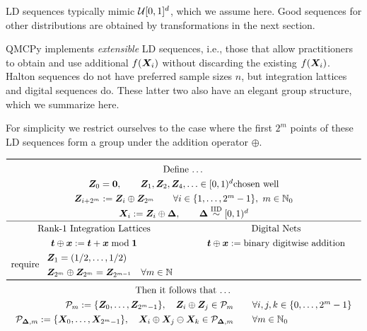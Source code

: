 \documentclass[graybox,footinfo]{svmult}
\newcommand{\IID}{\textup{IID}}
\newcommand{\IIDsim}{\overset{\IID}{\sim}}
\begin{document}
LD sequences typically mimic ${\mathcal{U}}[0,1]^d$, which we assume here.  Good sequences for other distributions are obtained by transformations in the next section.  

QMCPy implements \emph{extensible} LD sequences, i.e., those that allow practitioners to obtain and use additional $f({\boldsymbol{X}}_i)$ without discarding the existing $f({\boldsymbol{X}}_i)$.  Halton sequences do not have preferred sample sizes $n$, but integration lattices and digital sequences do.  These latter two also have an elegant group structure, which we summarize here.  

For simplicity we restrict ourselves to the case where the first $2^m$ points of these LD sequences form a group under the addition operator $\oplus$.

\[
	\renewcommand{\arraystretch}{1.3}
\begin{array}{c@{\qquad}c}
	\toprule
	\multicolumn{2}{c}{\text{Define \ldots}} \\
	\multicolumn{2}{c}{\bsZ_0 = \bszero, \qquad \bsZ_1, \bsZ_2, \bsZ_4, \ldots \in [0,1)^d \text{chosen well} } \\
	\multicolumn{2}{c}{
		\bsZ_{i + 2^m} := \bsZ_i \oplus \bsZ_{2^m} 
		 \qquad
    	\forall  i \in \{1, \ldots, 2^{m} -1\}, \ m \in \bbN_0 }\\
    	\multicolumn{2}{c}{\bsX_i := \bsZ_i \oplus \bsDelta, \qquad \bsDelta \IIDsim [0,1)^d} \\  \hline
	\text{Rank-1 Integration Lattices} & \text{Digital Nets} \\
		\bst \oplus \bsx : = \bst + \bsx \bmod \bsone & \bst \oplus \bsx := \text{binary digitwise addition} \\ 
		 \text{require } \begin{array}{l} \bsZ_1 = (1/2, \ldots, 1/2) \\
		 	\bsZ_{2^{m}} \oplus \bsZ_{2^{m}} = \bsZ_{2^{m-1}} \quad \forall m \in \bbN \end{array}
		\\
\toprule
\multicolumn{2}{c}{\text{Then it follows that \ldots}} \\
	\multicolumn{2}{c}{\begin{array}{r}
			\calP_m := \{\bsZ_0, \ldots, \bsZ_{2^m-1}\}, \quad
			\bsZ_i \oplus \bsZ_j \in \calP_m \\
			\calP_{\bsDelta,m} := \{\bsX_0, \ldots, \bsX_{2^m-1}\}, \quad
			\bsX_i \oplus \bsX_j \ominus \bsX_k \in \calP_{\bsDelta,m}
	\end{array} \quad \begin{array}{l}\forall  i,j,k \in \{0, \ldots, 2^{m} -1\} \\ \forall m \in \bbN_0\end{array}}
\end{array}
\]
\end{document}
